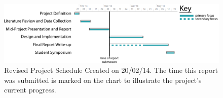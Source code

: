 \begin{figure}[H]
	\centering
	\includegraphics[scale=0.475]{figures/revised_project_schedule.pdf}
	\caption{Revised Project Schedule Created on 20/02/14. The time this report was submitted is marked on the chart to illustrate the project's current progress.}
	\label{fig:revised-schedule}
\end{figure}

\let \newpage \snewpage
\vfill 
\break %

